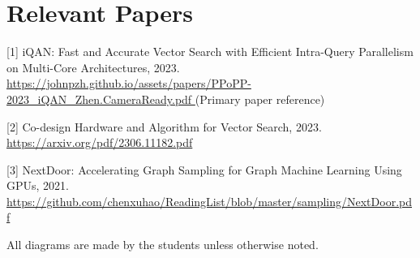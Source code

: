 \documentclass{article}
\begin{document}


\section{Relevant Papers}

[1] iQAN: Fast and Accurate Vector Search with Efficient Intra-Query Parallelism on Multi-Core Architectures, 2023. \href{https://johnpzh.github.io/assets/papers/PPoPP-2023\_iQAN\_Zhen.CameraReady.pdf}{https://johnpzh.github.io/assets/papers/PPoPP-2023\_iQAN\_Zhen.CameraReady.pdf } (Primary paper reference)

[2] Co-design Hardware and Algorithm for Vector Search, 2023. \href{https://arxiv.org/pdf/2306.11182.pdf} {https://arxiv.org/pdf/2306.11182.pdf }

[3] NextDoor: Accelerating Graph Sampling for Graph Machine Learning Using GPUs, 2021. 
\newline \href{https://github.com/chenxuhao/ReadingList/blob/master/sampling/NextDoor.pdf}{https://github.com/chenxuhao/ReadingList/blob/master/sampling/NextDoor.pdf }

All diagrams are made by the students unless otherwise noted.
\end{document}

